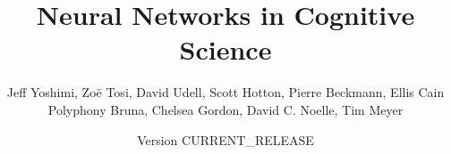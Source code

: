 



\title{Neural Networks in Cognitive Science}
\author{Jeff Yoshimi, Zo\"e Tosi, David Udell, Scott Hotton, Pierre Beckmann, Ellis Cain\\ Polyphony Bruna, Chelsea Gordon, David C. Noelle, Tim Meyer}
\date{Version CURRENT\_RELEASE}
\maketitle

\tableofcontents
























%

\figureAttributions
\bookReferences


